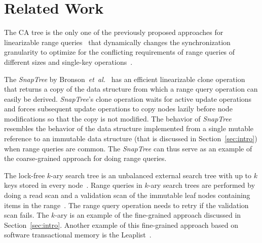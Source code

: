 \documentclass[a4paper,UKenglish]{oasics}
\newcommand{\etal}{\mbox{\textit{et al.}}\xspace}
\newcommand{\kary}{\mbox{$k$-ary}\xspace}
\begin{document}


\section{Related Work\label{sec:related}}
The CA tree is the only one of the previously proposed approaches for linearizable range queries~\cite{bronson2010practical,RangeQKArySeachTree,AvniLeaplist,CFRangeQueries,ChatterjeeLFRangeQueries,BasinKiWi} that dynamically changes the synchronization granularity to optimize for the conflicting requirements of range queries of different sizes and single-key operations~\cite{CATreeLCPC}.

The \emph{SnapTree} by Bronson~\etal~\cite{bronson2010practical} has an efficient linearizable clone operation that returns a copy of the data structure from which a range query operation can easily be derived.
\emph{SnapTree}'s clone operation waits for active update operations and forces subsequent update operations to copy nodes lazily before node modifications so that the copy is not modified.
The behavior of \emph{SnapTree} resembles the behavior of the data structure implemented from a single mutable reference to an immutable data structure (that is discussed in Section~\ref{sec:intro}) when range queries are common. %
The \emph{SnapTree} can thus serve as an example of the coarse-grained approach for doing range queries.

The lock-free \kary{} search tree is an unbalanced external search tree with up to $k$ keys stored in every node~\cite{NBKASearchTree}. %
Range queries in \kary{} search trees are performed by doing a read scan and a validation scan of the immutable leaf nodes containing items in the range~\cite{RangeQKArySeachTree}.
The range query operation needs to retry if the validation scan fails.
The \kary{} is an example of the fine-grained approach discussed in Section~\ref{sec:intro}.
Another example of this fine-grained approach based on software transactional memory is the Leaplist~\cite{AvniLeaplist}.
  
\end{document}
